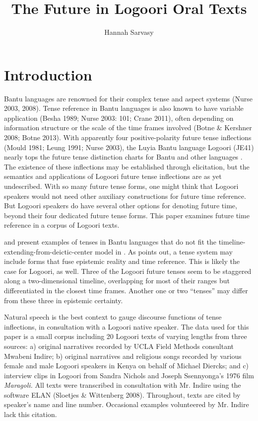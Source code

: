 \documentclass[output=paper]{langsci/langscibook}
\title{The Future in Logoori Oral Texts}
\author{%
Hannah Sarvasy \affiliation{Australian National University} 
}
\begin{document}
\section{Introduction} \label{sec:sarvasy:1}

Bantu languages are renowned for their complex tense and aspect systems (Nurse 2003, 2008). Tense reference in Bantu languages is also known to have variable application (Besha 1989; Nurse 2003: 101; Crane 2011), often depending on information structure or the scale of the time frames involved (Botne \& Kershner 2008; Botne 2013). With apparently four positive-polarity future tense inflections (Mould 1981; Leung 1991; Nurse 2003), the Luyia Bantu language Logoori (JE41) nearly tops the future tense distinction charts for Bantu and other languages \citep[89]{Nurse2008}. The existence of these inflections may be established through elicitation, but the semantics and applications of Logoori future tense inflections are as yet undescribed. With so many future tense forms, one might think that Logoori speakers would not need other auxiliary constructions for future time reference. But Logoori speakers do have several other options for denoting future time, beyond their four dedicated future tense forms. This paper examines future time reference in a corpus of Logoori texts.

\citet{BotneKershner2008} and \citet{Botne2013} present examples of tenses in Bantu languages that do not fit the timeline-extending-from-deictic-center model in \citet{Comrie1985}. As \citet{Botne2013} points out, a tense system may include forms that fuse epistemic reality and time reference. This is likely the case for Logoori, as well. Three of the Logoori future tenses seem to be staggered along a two-dimensional timeline, overlapping for most of their ranges but differentiated in the closest time frames. Another one or two “tenses” may differ from these three in epistemic certainty. 

Natural speech is the best context to gauge discourse functions of tense inflections, in consultation with a Logoori native speaker. The data used for this paper is a small corpus including 20 Logoori texts of varying lengths from three sources: a) original narratives recorded by UCLA Field Methods consultant Mwabeni Indire; b) original narratives and religious songs recorded by various female and male Logoori speakers in Kenya on behalf of Michael Diercks; and c) interview clips in Logoori from Sandra Nichols and Joseph Ssennyonga’s 1976 film \textit{Maragoli. }All texts were transcribed in consultation with Mr. Indire using the software ELAN (Sloetjes \& Wittenberg 2008). Throughout, texts are cited by speaker’s name and line number. Occasional examples volunteered by Mr. Indire lack this citation.
\end{document}
